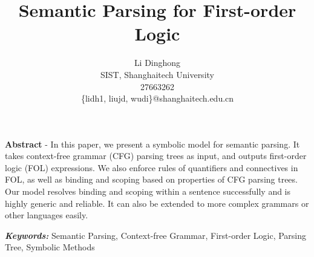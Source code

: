 \documentclass{article}
\title{Semantic Parsing for First-order Logic}
\author{
	Li Dinghong\\
	SIST, Shanghaitech University\\
	27663262\\
	\{lidh1, liujd, wudi\}@shanghaitech.edu.cn
}
\begin{document}
{
	\newpage
	\maketitle

	\textbf{Abstract} - {In this paper, we present a symbolic model for semantic parsing. It takes context-free grammar (CFG) parsing trees as input, and outputs first-order logic (FOL) expressions. We also enforce rules of quantifiers and connectives in FOL, as well as binding and scoping based on properties of CFG parsing trees. Our model resolves binding and scoping within a sentence successfully and is highly generic and reliable. It can also be extended to more complex grammars or other languages easily. }

	\vspace{5pt}
	\textbf{\emph{Keywords:}} {Semantic Parsing, Context-free Grammar, First-order Logic, Parsing Tree, Symbolic Methods}

	\tableofcontents
}
\end{document}
